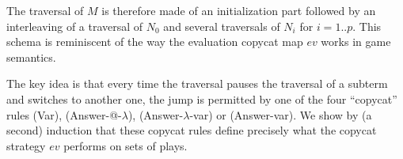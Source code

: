     The traversal of $M$ is therefore made of an initialization part followed by an interleaving of a traversal of $N_0$ and
    several traversals of $N_i$ for $i=1..p$. This schema is reminiscent of the way the evaluation copycat map $ev$ works in game semantics.

    The key idea is that every time the traversal pauses the traversal of a subterm and switches to another one,
    the jump is permitted by one of the four ``copycat'' rules (Var), (Answer-@-$\lambda$), (Answer-$\lambda$-var) or (Answer-var).
    We show by (a second) induction that these copycat rules define precisely what the copycat strategy $ev$ performs on sets of plays.

%
%
%
%
\smallskip

